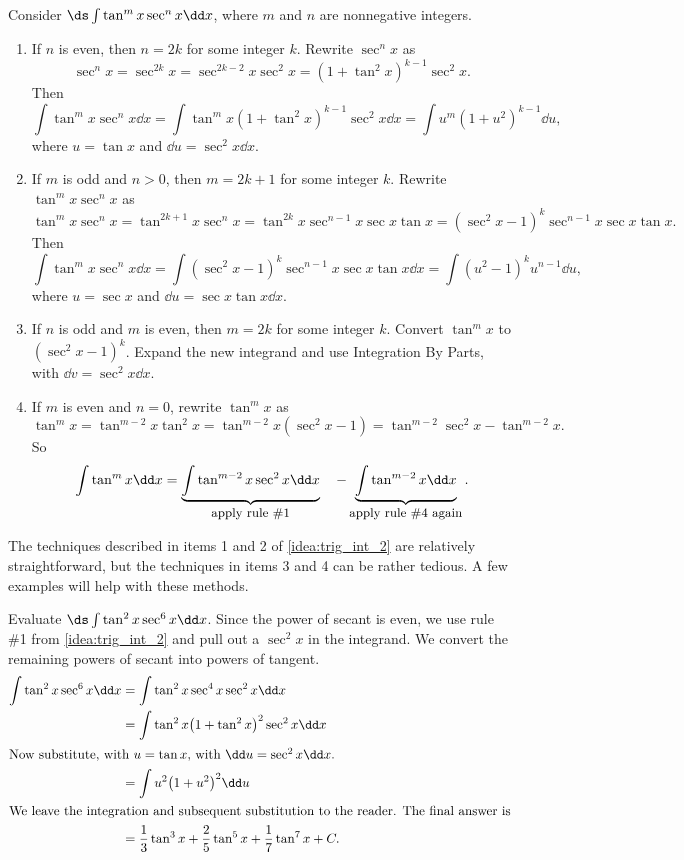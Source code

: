 {
\begin{keyidea}\label{idea:trig_int_2}
Consider $\ds\int\tan^mx\sec^nx\dd x$, where $m$ and $n$ are nonnegative integers.
\begin{enumerate}
\item		If $n$ is even, then $n=2k$ for some integer $k$. Rewrite $\sec^nx$ as 
\[\sec^nx = \sec^{2k}x = \sec^{2k-2}x\sec^2x = (1+\tan^2x)^{k-1}\sec^2x.\]
Then
\[
\int\tan^mx\sec^nx\dd x=\int\tan^mx(1+\tan^2x)^{k-1}\sec^2x\dd x = \int u^m(1+u^2)^{k-1}\dd u,
\]
where $u = \tan x$ and $\dd u = \sec^2x\dd x$.

\item		If $m$ is odd and $n>0$, then $m=2k+1$ for some integer $k$. Rewrite $\tan^mx\sec^nx$ as
\[
\tan^mx\sec^nx = \tan^{2k+1}x\sec^nx = \tan^{2k}x\sec^{n-1}x\sec x\tan x = (\sec^2x-1)^k\sec^{n-1}x\sec x\tan x.
\]
Then
\[
\int\tan^mx\sec^nx\dd x=\int(\sec^2x-1)^k\sec^{n-1}x\sec x\tan x\dd x = \int(u^2-1)^ku^{n-1}\dd u,
\]
where $u = \sec x$ and $\dd u = \sec x\tan x\dd x$.

\item If $n$ is odd and $m$ is even, then $m=2k$ for some integer $k$. Convert $\tan^mx $ to $(\sec^2x-1)^k$. Expand the new integrand and use Integration By Parts, with $\dd v = \sec^2x\dd x$.

\item		If $m$ is even and $n=0$, rewrite $\tan^mx$ as
\[
\tan^mx = \tan^{m-2}x\tan^2x = \tan^{m-2}x(\sec^2x-1) = \tan^{m-2}\sec^2x-\tan^{m-2}x.
\]
So
\[
\int\tan^mx\dd x = \underbrace{\int\tan^{m-2}x\sec^2x\dd x}_{\text{\small apply rule \#1}}\quad - \underbrace{\int\tan^{m-2}x\dd x}_{\text{\small apply rule \#4 again}}.
\]

\end{enumerate}
\end{keyidea}
}

The techniques described in items 1 and 2 of \autoref{idea:trig_int_2} are relatively straightforward, but the techniques in items 3 and 4 can be rather tedious. A few examples will help with these methods.

\begin{example}\label{ex_trigint5}
Evaluate $\ds\int \tan^2x\sec^6x\dd x$.
\solution
Since the power of secant is even, we use rule \#1 from \autoref{idea:trig_int_2} and pull out a $\sec^2x$ in the integrand. We convert the remaining powers of secant into powers of tangent.
\begin{align*}
\int \tan^2x\sec^6x\dd x &= \int\tan^2x\sec^4x\sec^2x\dd x \\
		&= \int \tan^2x\bigl(1+\tan^2x\bigr)^2\sec^2x\dd x \\
\intertext{Now substitute, with $u=\tan x$, with $\dd u = \sec^2x\dd x$.}
		&=\int u^2\bigl(1+u^2\bigr)^2\dd u\\
\intertext{We leave the integration and subsequent substitution to the reader. The final answer is}
		&=\frac13\tan^3x+\frac25\tan^5x+\frac17\tan^7x+C.
\end{align*}
\end{example}

